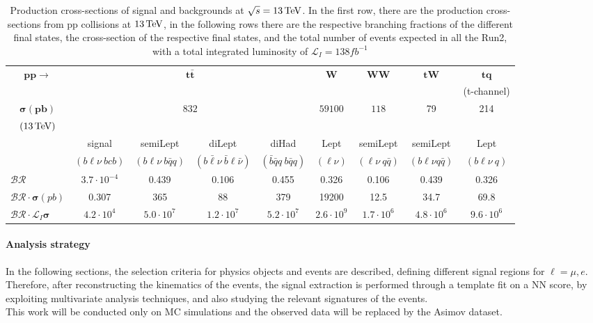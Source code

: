 \begin{table}[H]
    \centering
    \fontsize{9.2pt}{9.2pt}\selectfont
    \begin{tabular}{l|cccc|c|c|c|c}
        \toprule
          \multicolumn{1}{c|}{$\mathbf{pp\to}$}&\multicolumn{4}{c|}{$ \mathbf{t\bar{t}}$}&  $ \mathbf{W}$& $ \mathbf{WW}$ & $ \mathbf{tW}$& $ \mathbf{tq}$\\
          &&  &  &  &  &   & & (t-channel)\\
          \midrule
          \multicolumn{1}{c|}{$\mathbf{\sigma (pb)}$}&\multicolumn{4}{c|}{\multirow{2}{*}{$832$}}& \multirow{2}{*}{$59100$} & \multirow{2}{*}{$118$} &  \multirow{2}{*}{79}& \multirow{2}{*}{214} \\
          \multicolumn{1}{c|}{$(13{\,\text{Te\hspace{-.08em}V}})$}& &  & & &  &&&\\
          \midrule
          &signal&  semiLept&  diLept&  diHad& Lept &  semiLept & semiLept& Lept\\
          &$(b\ell \nu\: bcb)$&$(b\ell \nu\: b\bar{q}q)$&$(b\bar{\ell} \nu\: \bar{b}\ell \bar{\nu})$&$(\bar{b}\bar{q}q\: b\bar{q}q)$&$(\ell \nu)$&$(\ell \nu \: q\bar{q})$& $(b\ell\nu q \bar{q})$&$(b\ell\nu \: q)$\\
          \midrule
          $\mathcal{BR}$& $3.7 \cdot 10^{-4}$   & 0.439 & 0.106 & 0.455 & 0.326 & 0.106 & 0.439 & 0.326\\
          $ \mathcal{BR}\cdot\mathbf{\sigma} (pb)$& 0.307 & 365 & 88 & 379 & 19200 & 12.5 & 34.7& 69.8 \\
          $\mathcal{BR}\cdot\mathcal{L}_I\mathbf{\sigma} $&$4.2 \cdot 10^4$& $5.0 \cdot 10^7$ &  $1.2 \cdot 10^7$&$5.2 \cdot 10^7$  &  $2.6 \cdot 10^9$ & $1.7 \cdot 10^6$  & $4.8 \cdot 10^6$& $9.6 \cdot 10^{6}$\\
          \bottomrule
    \end{tabular}
    \vspace{0.2cm}
    \caption{Production cross-sections of signal and backgrounds at $\sqrt{s}=13{\,\text{Te\hspace{-.08em}V}}$. In the first row, there are the production cross-sections from pp collisions at $13 {\,\text{Te\hspace{-.08em}V}}$, in the following rows there are the respective branching fractions of the different final states, the cross-section of the respective final states, and the total number of events expected in all the Run2, with a total integrated luminosity of $\mathcal{L}_I=138 {fb}^{-1}$}
    \label{tab:cross}
\end{table}

\paragraph*{Analysis strategy}
In the following sections, the selection criteria for physics objects and events are described, defining different signal regions for $\ell=\mu,e$.
Therefore, after reconstructing the kinematics of the events, the signal extraction is performed through a template fit on a NN score, by exploiting multivariate analysis techniques, and also studying the relevant signatures of the events.\\
This work will be conducted only on MC simulations and the observed data will be replaced by the Asimov dataset.



